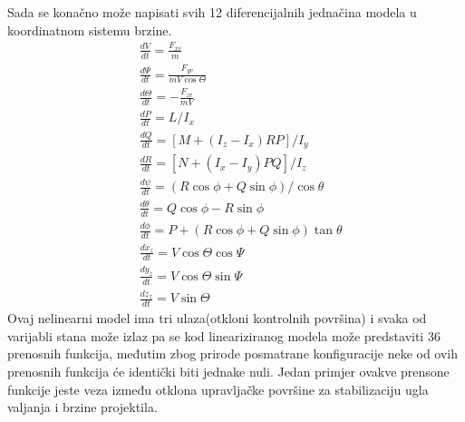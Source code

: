 Sada se konačno može napisati svih 12 diferencijalnih jednačina modela u koordinatnom sistemu brzine.
\begin{align}
    &\frac{dV}{dt} = \frac{F_{xv}}{m}\\
    &\frac{d\Psi}{dt} = \frac{F_{yv}}{mV\cos\Theta}\\
    &\frac{d\Theta}{dt} = -\frac{F_{zv}}{mV}\\
    &\frac{dP}{dt}=L/I_x\\
    &\frac{dQ}{dt}=[M+(I_z-I_x)RP]/I_y\\
    &\frac{dR}{dt}=[N+(I_x-I_y)PQ]/I_z\\
    &\frac{d\psi}{dt}=(R\cos\phi+Q\sin\phi)/\cos\theta\\
    &\frac{d\theta}{dt}=Q\cos\phi-R\sin\phi\\
    &\frac{d\phi}{dt}=P+(R\cos\phi+Q\sin\phi)\tan\theta\\
    &\frac{dx_z}{dt}=V\cos\Theta\cos\Psi\\
    &\frac{dy_z}{dt}=V\cos\Theta\sin\Psi\\
    &\frac{dz_z}{dt}=V\sin\Theta
\end{align}
Ovaj nelinearni model ima tri ulaza(otkloni kontrolnih površina) i svaka od varijabli stana može izlaz pa se kod lineariziranog 
modela može predstaviti 36 prenosnih funkcija, međutim zbog prirode posmatrane konfiguracije 
neke od ovih prenosnih funkcija će identički biti jednake nuli. Jedan primjer ovakve prensone funkcije 
jeste veza između otklona upravljačke površine za stabilizaciju ugla valjanja i brzine projektila. 
